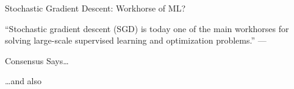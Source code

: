 \documentclass[notheorems]{beamer}
\def\\{}%
\begin{document}
\begin{frame}

    \end{frame}

    \begin{frame}{Stochastic Gradient Descent: Workhorse of ML?}

        \begin{center}
            \Large
            ``Stochastic gradient descent (SGD) is today one of the main workhorses for solving large-scale supervised learning and optimization problems.''\\
            ---\citet{drori2019complexity}
        \end{center}

    \end{frame}

    \begin{frame}{Consensus Says\ldots}

        \begin{center}
            \Large \dots and also~\citet{xu2017second,
            zhang2016parallel,
            patterson2017deep,
            pillaud2018statistical,
            grosse2015scaling,
            assran2018stochastic,
            damaskinos2019aggregathor,
            kawaguchi2020ordered,
            bernstein2018signsgd,
            li2019rsa,
            agarwal2017second,
            hofmann2015variance,
            geffner2019rule,
            assran2020convergence,
            gower2019sgd}
        \end{center}

    \end{frame}
\end{document}
